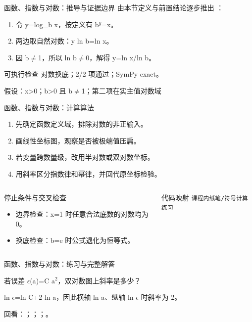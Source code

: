 \begin{frame}[t]{函数、指数与对数：推导与证据边界}
\footnotesize
{}\quad 由本节定义与前置结论逐步推出 ：
\begin{enumerate}
\item 令 y=log\_b x，按定义有 b\ensuremath{^{y}}=x。
\item 两边取自然对数：y ln b=ln x。
\item 因 b\ensuremath{\ne}1，所以 ln b\ensuremath{\ne}0，解得 y=ln x/\allowbreak{}ln b。
\end{enumerate}\begin{block}{可执行检查}
\quad 对数换底；2/2 项通过；SymPy exact。
\par\scriptsize 假设：x>0；b>0 且 b\ensuremath{\ne}1；第二项在实主值对数域
\end{block}
\end{frame}

\begin{frame}[t]{函数、指数与对数：计算算法}
\footnotesize
{}\begin{enumerate}
\item 先确定函数定义域，排除对数的非正输入。
\item 画线性坐标图，观察是否被极端值压扁。
\item 若变量跨数量级，改用半对数或双对数坐标。
\item 用斜率区分指数律和幂律，并回代原坐标检验。
\end{enumerate}\begin{columns}[T,onlytextwidth]
\begin{block}{停止条件与交叉检查}\scriptsize\begin{itemize}
\item[\CheckMark] 边界检查：x=1 时任意合法底数的对数均为 0。
\item[\CheckMark] 换底检查：b=e 时公式退化为恒等式。
\end{itemize}\end{block}
\begin{block}{代码映射}
\scriptsize \texttt{课程内纸笔/\allowbreak{}符号计算练习}
\end{block}\end{columns}\end{frame}

\begin{frame}[t]{函数、指数与对数：练习与完整解答}
\footnotesize
\begin{block}{}若误差 \ensuremath{\epsilon}(a)=C a\ensuremath{^{2}}，双对数图上斜率是多少？\end{block}
\begin{exampleblock}{}ln \ensuremath{\epsilon}=ln C+2 ln a，因此横轴 ln a、纵轴 ln \ensuremath{\epsilon} 时斜率为 2。\end{exampleblock}
\vfill
\scriptsize 回看：；；；。
\end{frame}

